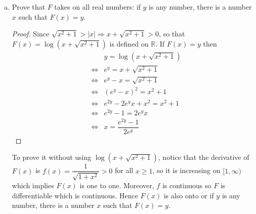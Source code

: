 \documentclass[10pt,letterpaper]{article}
\begin{document}
\begin{enumerate}[(a)]
\item Prove that $F$ takes on all real numbers: if $y$ is any number, there is a number $x$
such that $F(x) = y$.
	\begin{proof}
	Since $\sqrt{x^2 + 1} > |x| \Rightarrow x + \sqrt{x^2 + 1} > 0$, so that $F(x) = 
	\log(x + \sqrt{x^2 + 1})$ is defined on $\mathbb{R}$. If $F(x) = y$
	then
\begin{eqnarray*}
	& & y = \log(x + \sqrt{x^2 + 1}) \\
	& \Leftrightarrow & e^y = x + \sqrt{x^2 + 1} \\
	& \Leftrightarrow & e^y - x = \sqrt{x^2 + 1} \\
	& \Leftrightarrow & (e^y - x)^2 = x^2 + 1 \\
	& \Leftrightarrow & e^{2y} - 2e^yx + x^2 = x^2 + 1 \\
	& \Leftrightarrow & e^{2y} - 1 = 2e^yx \\
	& \Leftrightarrow & x = \dfrac{e^{2y} - 1}{2e^y} 
\end{eqnarray*}
	\end{proof}
	To prove it without using $\log(x + \sqrt{x^2 + 1})$, notice that the derivative of 
	$F(x)$ is $f(x) = \dfrac{1}{\sqrt{1 + x^2}} > 0$ for all $x \geq 1$, so it is increasing on
	$[1, \infty)$ which implies $F(x)$ is one to one. Moreover, $f$ is continuous so $F$ is differentiable
	which is continuous. Hence $F(x)$ is also onto or if $y$ is any number, there is a number $x$
	such that $F(x) = y$.
\end{enumerate}
	
	
\end{document}

